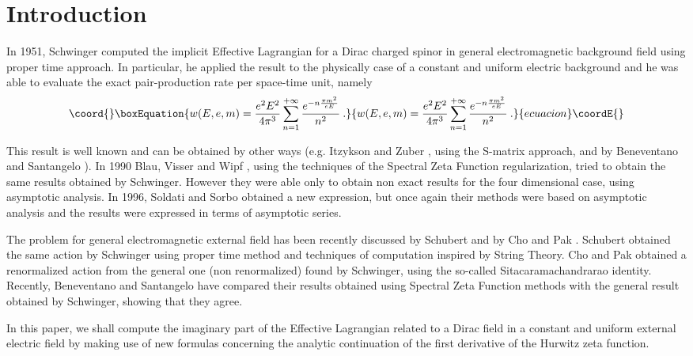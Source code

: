 \documentclass [11pt]{article}
\begin{document}
\section{Introduction}

In 1951, Schwinger \cite{Schwinger:1951nm} computed the implicit Effective Lagrangian for a Dirac charged
spinor in general electromagnetic background field using proper time approach.
 In particular, he applied the result to the physically  case of a constant 
and uniform
 electric background and he was able to evaluate 
the exact pair-production rate per space-time unit, namely
\begin{equation}\coord{}\boxEquation{
\label{schw}
w(E,e,m)=\frac{e^{2}E^{2}}{4\pi ^{3}}\sum _{n=1}^{+\infty }\frac{e^{-n\frac{\pi m^{2}}{eE}}}{n^{2}}\:.
}{
w(E,e,m)=\frac{e^{2}E^{2}}{4\pi ^{3}}\sum _{n=1}^{+\infty }\frac{e^{-n\frac{\pi m^{2}}{eE}}}{n^{2}}\:.
}{ecuacion}\coordE{}\end{equation}

This result is well known and can be obtained by other ways (e.g. Itzykson and
Zuber \cite{2}, using the S-matrix approach, and by Beneventano and Santangelo \cite{3}). In 1990 Blau, Visser and Wipf
\cite{Blau:1991iz}, using the techniques of
the Spectral Zeta Function regularization, tried to obtain the same results 
obtained by
Schwinger. However they were able  
only to obtain non exact results for the four dimensional case,
 using asymptotic analysis. In 1996, Soldati and Sorbo \cite{Soldati:1998vq} obtained a new expression,
but once again their methods were based on asymptotic analysis and the results were expressed in terms of
asymptotic series.

The problem for general electromagnetic external field 
has been recently discussed  by Schubert \cite{Schubert:2000yt} and by 
Cho and Pak \cite{Cho:2001ei}. Schubert obtained the same action by Schwinger  using proper time method and techniques of 
computation inspired by String Theory. Cho and Pak  obtained a 
renormalized action from the general one (non renormalized) 
found by Schwinger, using the so-called  Sitacaramachandrarao identity.
Recently, Beneventano and Santangelo \cite{5} have compared their results 
obtained using Spectral Zeta Function methods  with the 
general result obtained by Schwinger, showing that they agree.

In this paper, we shall compute the imaginary part of the Effective Lagrangian 
related to a Dirac field in a constant and uniform external electric field by
making use of new formulas concerning the analytic continuation of the 
first derivative of the  Hurwitz zeta function.
\end{document}
